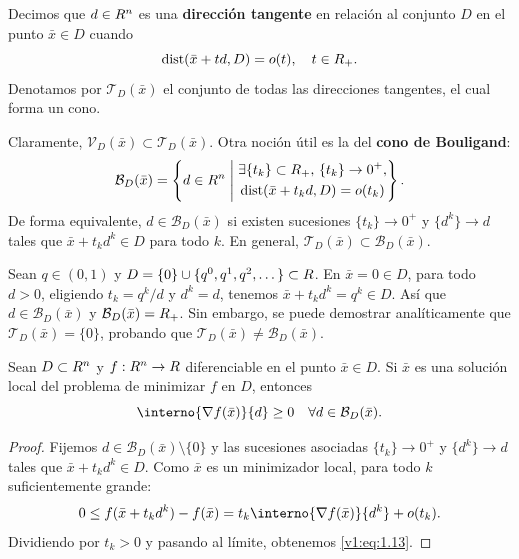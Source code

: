 \begin{definition}\label{v1:def:1.4.4}
 Decimos que $d \in R^n$ es una \textbf{dirección tangente} en relación al conjunto $D$ en el punto $\bar{x} \in D$ cuando
 \[
 \operatorname{dist}(\bar{x} + td, D) = o(t), \quad t \in R_+.
 \]
 Denotamos por $\mathcal{T}_D(\bar{x})$ el conjunto de todas las direcciones tangentes, el cual forma un cono.
\end{definition}

Claramente, $\mathcal{V}_D(\bar{x}) \subset \mathcal{T}_D(\bar{x})$. Otra noción útil es la del \textbf{cono de Bouligand}:
\begin{equation}
 \mathcal{B}_D(\bar{x}) = \left\{ d \in R^n \;\middle|\; \begin{aligned} &\exists \{t_k\} \subset R_+, \, \{t_k\} \to 0^+, \\ &\operatorname{dist}(\bar{x} + t_k d, D) = o(t_k) \end{aligned} \right\}. \label{v1:eq:1.12}
\end{equation}
De forma equivalente, $d \in \mathcal{B}_D(\bar{x})$ si existen sucesiones $\{t_k\} \to 0^+$ y $\{d^k\} \to d$ tales que $\bar{x} + t_k d^k \in D$ para todo $k$. En general, $\mathcal{T}_D(\bar{x}) \subset \mathcal{B}_D(\bar{x})$. 

\begin{example}\label{v1:exa:1.4.1}
 Sean $q \in (0,1)$ y $D = \{0\} \cup \{q^0, q^1, q^2, \dots\} \subset R$. En $\bar{x} = 0 \in D$, para todo $d > 0$, eligiendo $t_k = q^k / d$ y $d^k = d$, tenemos $\bar{x} + t_k d^k = q^k \in D$. Así que $d \in \mathcal{B}_D(\bar{x})$ y $\mathcal{B}_D(\bar{x}) = R_+$. Sin embargo, se puede demostrar analíticamente que $\mathcal{T}_D(\bar{x}) = \{0\}$, probando que $\mathcal{T}_D(\bar{x}) \neq \mathcal{B}_D(\bar{x})$.
\end{example}

\begin{theorem}\label{v1:thm:1.4.1}
 Sean $D \subset R^n$ y $f : R^n \to R$ diferenciable en el punto $\bar{x} \in D$. Si $\bar{x}$ es una solución local del problema de minimizar $f$ en $D$, entonces
 \begin{equation}
 \interno{\nabla f(\bar{x})}{d} \ge 0 \quad \forall d \in \mathcal{B}_D(\bar{x}). \label{v1:eq:1.13}
 \end{equation}
\end{theorem}

\begin{proof}
 Fijemos $d \in \mathcal{B}_D(\bar{x}) \setminus \{0\}$ y las sucesiones asociadas $\{t_k\} \to 0^+$ y $\{d^k\} \to d$ tales que $\bar{x} + t_k d^k \in D$. Como $\bar{x}$ es un minimizador local, para todo $k$ suficientemente grande:
 \[
 0 \le f(\bar{x} + t_k d^k) - f(\bar{x}) = t_k \interno{\nabla f(\bar{x})}{d^k} + o(t_k).
 \]
 Dividiendo por $t_k > 0$ y pasando al límite, obtenemos \eqref{v1:eq:1.13}.
\end{proof}

